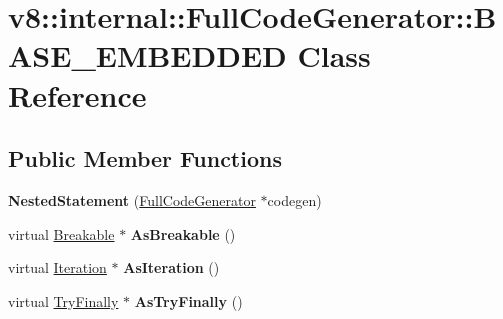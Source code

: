 \hypertarget{classv8_1_1internal_1_1_full_code_generator_1_1_b_a_s_e___e_m_b_e_d_d_e_d}{}\section{v8\+:\+:internal\+:\+:Full\+Code\+Generator\+:\+:B\+A\+S\+E\+\_\+\+E\+M\+B\+E\+D\+D\+ED Class Reference}
\label{classv8_1_1internal_1_1_full_code_generator_1_1_b_a_s_e___e_m_b_e_d_d_e_d}
\subsection*{Public Member Functions}
\begin{DoxyCompactItemize}
\item 
{\bfseries Nested\+Statement} (\hyperlink{classv8_1_1internal_1_1_full_code_generator}{Full\+Code\+Generator} $\ast$codegen)\hypertarget{classv8_1_1internal_1_1_full_code_generator_1_1_b_a_s_e___e_m_b_e_d_d_e_d_a3c0b33fc58a8bdb3b424bcb23676e239}{}\label{classv8_1_1internal_1_1_full_code_generator_1_1_b_a_s_e___e_m_b_e_d_d_e_d_a3c0b33fc58a8bdb3b424bcb23676e239}

\item 
virtual \hyperlink{classv8_1_1internal_1_1_full_code_generator_1_1_breakable}{Breakable} $\ast$ {\bfseries As\+Breakable} ()\hypertarget{classv8_1_1internal_1_1_full_code_generator_1_1_b_a_s_e___e_m_b_e_d_d_e_d_af24a7271df51b13020887d7c3df4529a}{}\label{classv8_1_1internal_1_1_full_code_generator_1_1_b_a_s_e___e_m_b_e_d_d_e_d_af24a7271df51b13020887d7c3df4529a}

\item 
virtual \hyperlink{classv8_1_1internal_1_1_full_code_generator_1_1_iteration}{Iteration} $\ast$ {\bfseries As\+Iteration} ()\hypertarget{classv8_1_1internal_1_1_full_code_generator_1_1_b_a_s_e___e_m_b_e_d_d_e_d_ae25aa4fe873fef090ef3fe3134d203ba}{}\label{classv8_1_1internal_1_1_full_code_generator_1_1_b_a_s_e___e_m_b_e_d_d_e_d_ae25aa4fe873fef090ef3fe3134d203ba}

\item 
virtual \hyperlink{classv8_1_1internal_1_1_full_code_generator_1_1_try_finally}{Try\+Finally} $\ast$ {\bfseries As\+Try\+Finally} ()\hypertarget{classv8_1_1internal_1_1_full_code_generator_1_1_b_a_s_e___e_m_b_e_d_d_e_d_ab665e13df5bdc7a00c13b8603cd3884b}{}\label{classv8_1_1internal_1_1_full_code_generator_1_1_b_a_s_e___e_m_b_e_d_d_e_d_ab665e13df5bdc7a00c13b8603cd3884b}


\end{DoxyCompactItemize}
